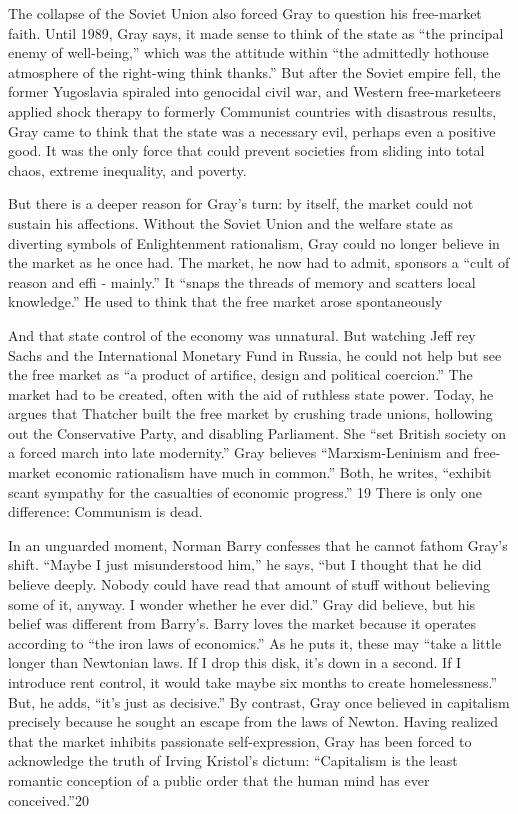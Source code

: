  \par 
The collapse of the Soviet Union also forced Gray to question his free-market faith. Until 1989, Gray says, it made sense to think of the state as “the principal enemy of well-being,” which was the attitude within “the admittedly hothouse atmosphere of the right-wing think thanks.” But after the Soviet empire fell, the former Yugoslavia spiraled into genocidal civil war, and Western free-marketeers applied shock therapy to formerly Communist countries with disastrous results, Gray came to think that the state was a necessary evil, perhaps even a positive good. It was the only force that could prevent societies from sliding into total chaos, extreme inequality, and poverty.
 \par 
But there is a deeper reason for Gray’s turn: by itself, the market could not sustain his affections. Without the Soviet Union and the welfare state as diverting symbols of Enlightenment rationalism, Gray could no longer believe in the market as he once had. The market, he now had to admit, sponsors a “cult of reason and effi - mainly.” It “snaps the threads of memory and scatters local knowledge.” He used to think that the free market arose spontaneously
 \par 
And that state control of the economy was unnatural. But watching Jeff rey Sachs and the International Monetary Fund in Russia, he could not help but see the free market as “a product of artifice, design and political coercion.” The market had to be created, often with the aid of ruthless state power. Today, he argues that Thatcher built the free market by crushing trade unions, hollowing out the Conservative Party, and disabling Parliament. She “set British society on a forced march into late modernity.” Gray believes “Marxism-Leninism and free-market economic rationalism have much in common.” Both, he writes, “exhibit scant sympathy for the casualties of economic progress.” {\color{blue}19} There is only one difference: Communism is dead.
 \par 
In an unguarded moment, Norman Barry confesses that he cannot fathom Gray’s shift. “Maybe I just misunderstood him,” he says, “but I thought that he did believe deeply. Nobody could have read that amount of stuff without believing some of it, anyway. I wonder whether he ever did.” Gray did believe, but his belief was different from Barry’s. Barry loves the market because it operates according to “the iron laws of economics.” As he puts it, these may “take a little longer than Newtonian laws. If I drop this disk, it’s down in a second. If I introduce rent control, it would take maybe six months to create homelessness.” But, he adds, “it’s just as decisive.” By contrast, Gray once believed in capitalism precisely because he sought an escape from the laws of Newton. Having realized that the market inhibits passionate self-expression, Gray has been forced to acknowledge the truth of Irving Kristol’s dictum: “Capitalism is the least romantic conception of a public order that the human mind has ever conceived.”{\color{blue}20}
